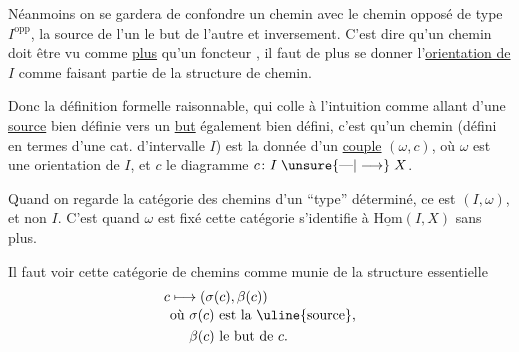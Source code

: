 
Néanmoins on se gardera de  confondre un chemin  avec le chemin opposé de type $I^{\mathrm{opp}}$, la source de l'un  le but de l'autre et inversement. C'est dire qu'un chemin doit être vu comme \uline{plus} qu'un  foncteur
,
il faut de plus se donner l'\uline{orientation de} $I$ comme faisant partie de la structure de chemin.

Donc la définition formelle raisonnable, qui colle à l'intuition  comme allant d'une \uline{source} bien définie vers un \uline{but} également bien défini, c'est qu'un chemin (défini en termes d'une cat. d'intervalle $I$) est la donnée d'un \uline{couple} $(\omega,c)$, où $\omega$ est une orientation de $I$, et $c$ le diagramme $c\colon I\mathrel{\unsure{\text{---}|\longrightarrow}}X$.

Quand on regarde la catégorie des chemins d'un ``type'' déterminé, ce  est $(I,\omega)$, et non $I$. C'est quand $\omega$ est fixé    cette catégorie s'identifie  à  $\underline{\mathrm{Hom}}(I,X)$ sans plus.

Il faut voir cette catégorie de chemins comme munie de la structure essentielle
\[ \begin{aligned} c&\longmapsto(\sigma(c),\beta(c))\\[-2pt] &\text{où }\sigma(c)\text{ est la \uline{source},}\\ &\phantom{\text{où }}\beta(c)\text{ le but de }c. \end{aligned} \]

